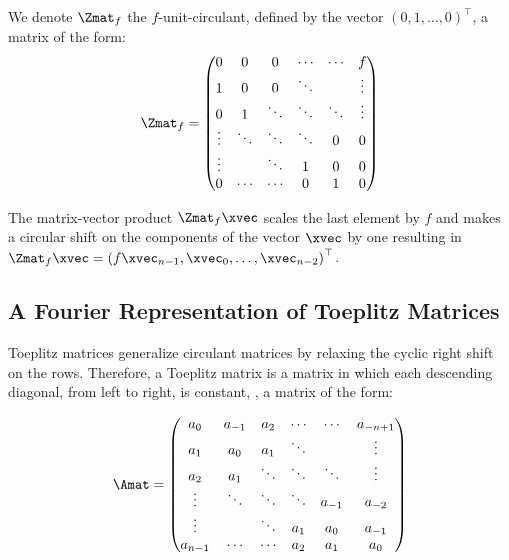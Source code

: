 \noindent
We denote $\Zmat_f$ the $f$-unit-circulant, defined by the vector $\left(0, 1, \dots, 0 \right)^\top$, a matrix of the form:
\begin{equation}
  \Zmat_f = 
    \leftmatrix
      0      & 0      & 0      & \cdots & \cdots & f      \\
      1      & 0      & 0      & \ddots &        & \vdots \\
      0      & 1      & \ddots & \ddots & \ddots & \vdots \\ 
      \vdots & \ddots & \ddots & \ddots & 0      & 0      \\
      \vdots &        & \ddots & 1      & 0      & 0      \\
      0      & \cdots & \cdots & 0      & 1      & 0
    \rightmatrix
\end{equation}

\noindent
The matrix-vector product $\Zmat_f \xvec$ scales the last element by $f$ and makes a circular shift on the components of the vector $\xvec$ by one resulting in $\Zmat_f \xvec = \leftmat f \xvec_{n-1}, \xvec_0, \dots, \xvec_{n-2} \rightmat^\top$.



\subsection{A Fourier Representation of Toeplitz Matrices}
\label{subsection:ch2-a_fourier_representation_of_toeplitz_matrices}

Toeplitz matrices generalize circulant matrices by relaxing the cyclic right shift on the rows.
Therefore, a Toeplitz matrix is a matrix in which each descending diagonal, from left to right, is constant, \ie, a matrix of the form:

\begin{equation}
  \Amat =
  \leftmatrix
    a_{0}   & a_{-1} & a_{2}  & \cdots & \cdots & a_{-n+1} \\
    a_{1}   & a_{0}  & a_{1}  & \ddots &        & \vdots   \\
    a_{2}   & a_{1}  & \ddots & \ddots & \ddots & \vdots   \\
    \vdots  & \ddots & \ddots & \ddots & a_{-1} & a_{-2}   \\
    \vdots  &        & \ddots & a_{1}  & a_{0}  & a_{-1}   \\
    a_{n-1} & \cdots & \cdots & a_{2}  & a_{1}  & a_{0}
  \rightmatrix
\end{equation}

